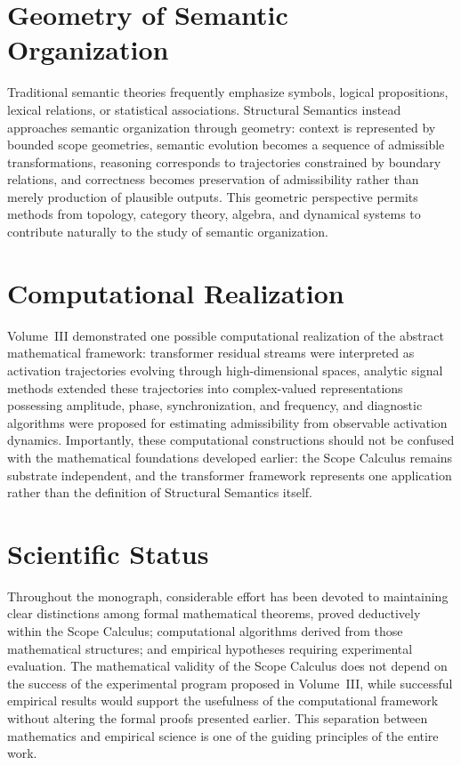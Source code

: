 \documentclass[11pt,twoside,openright]{book}
\numberwithin{equation}{chapter}
\theoremstyle{definition}
\theoremstyle{plain}
\theoremstyle{remark}
\theoremstyle{definition}
\begin{document}
\section{Geometry of Semantic Organization}

Traditional semantic theories frequently emphasize symbols, logical
propositions, lexical relations, or statistical associations. Structural
Semantics instead approaches semantic organization through geometry:
context is represented by bounded scope geometries, semantic evolution
becomes a sequence of admissible transformations, reasoning corresponds
to trajectories constrained by boundary relations, and correctness
becomes preservation of admissibility rather than merely production of
plausible outputs. This geometric perspective permits methods from
topology, category theory, algebra, and dynamical systems to contribute
naturally to the study of semantic organization.

\section{Computational Realization}

Volume~III demonstrated one possible computational realization of the
abstract mathematical framework: transformer residual streams were
interpreted as activation trajectories evolving through high-dimensional
spaces, analytic signal methods extended these trajectories into
complex-valued representations possessing amplitude, phase,
synchronization, and frequency, and diagnostic algorithms were proposed
for estimating admissibility from observable activation dynamics.
Importantly, these computational constructions should not be confused
with the mathematical foundations developed earlier: the Scope Calculus
remains substrate independent, and the transformer framework represents
one application rather than the definition of Structural Semantics
itself.

\section{Scientific Status}

Throughout the monograph, considerable effort has been devoted to
maintaining clear distinctions among formal mathematical theorems, proved
deductively within the Scope Calculus; computational algorithms derived
from those mathematical structures; and empirical hypotheses requiring
experimental evaluation. The mathematical validity of the Scope Calculus
does not depend on the success of the experimental program proposed in
Volume~III, while successful empirical results would support the
usefulness of the computational framework without altering the formal
proofs presented earlier. This separation between mathematics and
empirical science is one of the guiding principles of the entire work.
\end{document}

